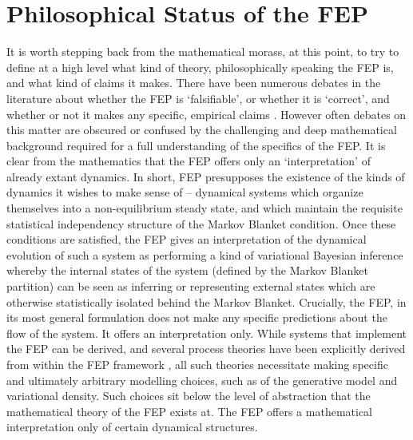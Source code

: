 \section{Philosophical Status of the FEP}
It is worth stepping back from the mathematical morass, at this point, to try to define at a high level what kind of theory, philosophically speaking the FEP is, and what kind of claims it makes. There have been numerous debates in the literature about whether the FEP is `falsifiable', or whether it is `correct', and whether or not it makes any specific, empirical claims \citep{williams2020brain,andrews2020math}. However often debates on this matter are obscured or confused by the challenging and deep mathematical background required for a full understanding of the specifics of the FEP. It is clear from the mathematics that the FEP offers only an `interpretation' of already extant dynamics. In short, FEP presupposes the existence of the kinds of dynamics it wishes to make sense of -- dynamical systems which organize themselves into a non-equilibrium steady state, and which maintain the requisite statistical independency structure of the Markov Blanket condition. Once these conditions are satisfied, the FEP gives an interpretation of the dynamical evolution of such a system as performing a kind of variational Bayesian inference whereby the internal states of the system (defined by the Markov Blanket partition) can be seen as inferring or representing external states which are otherwise statistically isolated behind the Markov Blanket. Crucially, the FEP, in its most general formulation does not make any specific predictions about the flow of the system. It offers an interpretation only. While systems that implement the FEP can be derived, and several process theories have been explicitly derived from within the FEP framework \citep{friston2005theory,friston2015active}, all such theories necessitate making specific and ultimately arbitrary modelling choices, such as of the generative model and variational density. Such choices sit below the level of abstraction that the mathematical theory of the FEP exists at. The FEP offers a mathematical interpretation only of certain dynamical structures.

